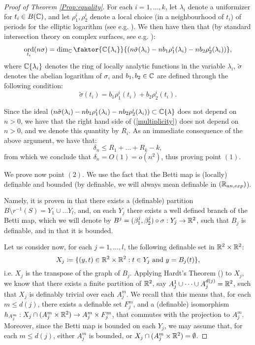 \documentclass[a4paper,12pt]{article}
\theoremstyle{remark}
\DeclareMathOperator{\ord}{ord}
\begin{document}
\begin{proof}[Proof of Theorem \ref{Prop:equality}]
	For each $i=1,\dots, k$, let $\lambda_i$ denote a uniformizer for $t_i \in B(\mathbb C)$, and let $\rho^i_1, \rho^i_2$ denote a local choice (in a neighbourhood of $t_i$) of periods for the elliptic logarithm (see e.g. \cite[Section 1.1]{bettitorsion}). We then have then that (by standard intersection theory on complex surfaces, see e.g. \cite[Chapter I]{beauville}):
	\begin{equation}\label{multiplicity}
	\ord_{t_i}(n\sigma)=\dim_{\C} \faktor{\C\{\lambda_i\}}{(n\tilde{\sigma}(\lambda_i)-nb_1\rho^i_1(\lambda_i)-nb_2\rho^i_2(\lambda_i))}, 
	\end{equation}
	where $\mathbb C\{\lambda_i\}$ denotes the ring of locally analytic functions in the variable $\lambda_i$, $\tilde{\sigma}$ denotes the abelian logarithm of $\sigma$, and $b_1, b_2 \in \mathbb C$ are defined through the following condition: \[\tilde{\sigma}(t_i)=b_1\rho^i_1(t_i)+b_2\rho^i_2(t_i).\]	
	
	Since the ideal $(n\tilde{\sigma}(\lambda_i)-nb_1\rho^i_1(\lambda_i)-nb_2\rho^i_2(\lambda_i)) \subset \mathbb C\{\lambda\}$ does not depend on $n>0$, we have that the right hand side of (\ref{multiplicity}) does not depend on $n>0$, and we denote this quantity by $R_i$. As an immediate consequence of the above argument, we have that:
	\[
	\delta_n \leq R_1 + \dots + R_k - k,
	\] 
	from which we conclude that $\delta_n =O(1)=o(n^2)$, thus proving point $(1)$.
	
	We prove now point $(2)$. We use the fact that the Betti map is (locally) definable and bounded (by definable, we will always mean definable in $(\mathbb R_{an,exp})$). 
	
	Namely, it is proven in \cite[Section 10]{garethschmidt} that there exists a (definable) partition $B\setminus r^{-1}(S)=Y_1 \cup \dots Y_l$, and, on each $Y_j$ there exists a well defined branch of the Betti map, which we will denote by $B^j=(\beta^j_1,\beta^j_2)\circ \sigma: Y_j \rightarrow \mathbb R^2$, such that $B_j$ is definable, and in \cite[Proposition 4]{garethschmidt} that it is bounded. 
	
	Let us consider now, for each $j=1,\dots, l$, the following definable set in $\mathbb R^2 \times \mathbb R^2$:
	\[
	X_j\coloneqq \{(y,t) \in \mathbb R^2 \times \mathbb R^2: t \in Y_j \text{ and } y=B_j(t)\},
	\]
	i.e. $X_j$ is the transpose of the graph of $B_j$. Applying Hardt's Theorem (\cite[Theorem 9.1.2]{tametopology}) to $X_j$, we know that there exists a finite partition of $\mathbb R^2$, say $A_j^1\cup\dots \cup A_j^{d(j)}=\mathbb R^2$, such that $X_j$ is definably trivial over each $A_j^m$.  We recall that this means that, for each $m \leq d(j)$, there exists a definable set $F_j^m$, and a (definable) isomorphism $h_{A_j^m}:X_j\cap (A_j^m\times \mathbb R^2)\rightarrow A_j^m\times F_j^m$, that commutes with the projection to $A_j^m$. Moreover, since the Betti map is bounded on each $Y_j$, we may assume that, for each $m \leq d(j)$, either $A_j^m$ is bounded, or $X_j\cap (A_j^m\times \mathbb R^2)=\emptyset$. 
	

\end{proof}
\end{document}
